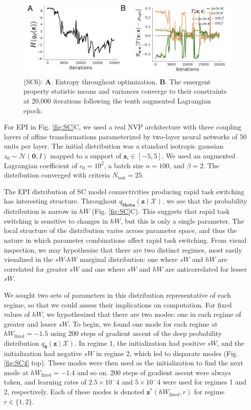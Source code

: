 \documentclass[11pt]{article}
\begin{document}
\begin{figure}
\begin{center}
\includegraphics[scale=0.5]{figures/figSC6/figSC6.pdf}
\end{center}
\caption{\small (SC6): 
\textbf{A}. Entropy throughout optimization. 
\textbf{B}. The emergent property statistic means and variances converge to their constraints at 20,000 iterations following the tenth augmented Lagrangian epoch.
}
\label{fig:SC6}
\end{figure}

For EPI in Fig. \ref{fig:SC}C, we used a real NVP architecture with three coupling layers of affine transformations parameterized by two-layer neural networks of 50 units per layer.
The initial distribution was a standard isotropic gaussian $z_0 \sim \mathcal{N}(\mathbf{0}, I)$ mapped to a support of $\mathbf{z}_i \in [-5, 5]$. 
We used an augmented Lagrangian coefficient of $c_0 = 10^{2}$, a batch size $n=100$, and $\beta=2$.
The distribution converged with criteria $N_{\text{test}} = 25$.

The EPI distribution of SC model connectivities producing rapid task switching has interesting structure.
Throughout $q_{\bm{theta}}(\mathbf{z} \mid \mathcal{X})$, we see that the probability distribution is narrow in $hW$ (Fig. \ref{fig:SC}C).
This suggests that rapid task switching is sensitive to changes in $hW$, but this is only a single parameter.
The local structure of the distribution varies across parameter space, and thus the nature in which parameter combinations affect rapid task switching.
From visual inspection, we may hypothesize that there are two distinct regimes, most easily visualized in the $sW$-$hW$ marginal distribution: one where $sW$ and $hW$ are correlated for greater $sW$ and one where $sW$ and $hW$ are anticorrelated for lesser $sW$.

We sought two sets of parameters in this distribution representative of each regime, so that we could assess their implications on computation.
For fixed values of $hW$, we hypothesized that there are two modes: one in each regime of greater and lesser $sW$.
To begin, we found one mode for each regime at $hW_{\text{fixed}} = -1.5$ using 200 steps of gradient ascent of the deep probability distribution $q_{\bm{\theta}}(\mathbf{z} \mid \mathcal{X})$.
In regime 1, the initialization had positive $sW$, and the initialization had negative $sW$ in regime 2, which led to disparate modes (Fig. \ref{fig:SC4} top).
These modes were then used as the initialization to find the next mode at $hW_{\text{fixed}} = -1.4$ and so on.
200 steps of gradient ascent were always taken, and learning rates of $2.5 \times 10^-4$ and $5 \times 10^-4$ were used for regimes 1 and 2, respectively.
Each of these modes is denoted $\mathbf{z}^*(hW_{\text{fixed}}, r)$ for regime $r \in \{1, 2\}$.
\end{document}
